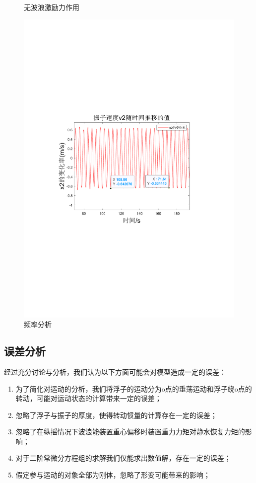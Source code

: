 \documentclass[12pt,utf8]{article}
\begin{document}
\begin{figure}[htbp]
{\begin{minipage}[t]{0.5\textwidth}
		\end{minipage}
	}
	\caption{无波浪激励力作用}
\end{figure}

\begin{figure}
	\centering
	\includegraphics[width=0.7\linewidth]{figures/频率分析.pdf}
	\caption{频率分析}
\end{figure}

\subsection{误差分析}

经过充分讨论与分析，我们认为以下方面可能会对模型造成一定的误差：
\begin{enumerate}
	\item 为了简化对运动的分析，我们将浮子的运动分为o点的垂荡运动和浮子绕o点的转动，可能对运动状态的计算带来一定的误差；
	\item 忽略了浮子与振子的厚度，使得转动惯量的计算存在一定的误差；
	\item 忽略了在纵摇情况下波浪能装置重心偏移时装置重力力矩对静水恢复力矩的影响；
	\item 对于二阶常微分方程组的求解我们仅能求出数值解，存在一定的误差；
	\item 假定参与运动的对象全部为刚体，忽略了形变可能带来的影响；
\end{enumerate}
\end{document}
